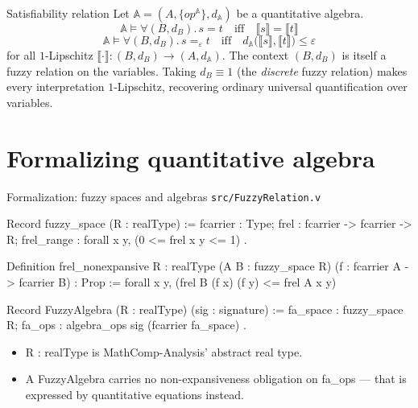 \documentclass[10pt,aspectratio=169]{beamer}
\newcommand{\qeq}[1]{=_{#1}}
\newcommand{\den}[1]{\llbracket #1 \rrbracket}
\newcommand{\eps}{\varepsilon}
\newcommand{\file}[1]{{\color{rocqcon}\texttt{#1}}}
\newcommand{\rid}[1]{{\ttfamily\small #1}}
\begin{document}
\begin{frame}{Satisfiability relation}
  Let $\mathbb{A} = (A, \{op^{\mathbb{A}}\}, d_{\mathbb{A}})$ be a
  quantitative algebra.
  \vfill
  \[
    \mathbb{A} \models \forall (B,d_B).\, s = t
    \quad\text{iff}\quad
    \den{s} = \den{t}
  \]
  \vspace{-1em}
  \[
    \mathbb{A} \models \forall (B,d_B).\, s \qeq{\eps} t
    \quad\text{iff}\quad
    d_{\mathbb{A}}\bigl(\den{s},\den{t}\bigr) \leq \eps
  \]
  \vfill
  for all $1$-Lipschitz $\den{\cdot} : (B,d_B) \to
  (A,d_\mathbb{A})$.
  \vfill
  \pause
  {\small The context $(B,d_B)$ is itself a fuzzy relation on the
  variables. Taking $d_B \equiv 1$ (the \emph{discrete} fuzzy relation)
  makes every interpretation $1$-Lipschitz, recovering ordinary
  universal quantification over variables.}
\end{frame}

\section{Formalizing quantitative algebra}

\begin{frame}[fragile]{Formalization: fuzzy spaces and algebras}
  \file{src/FuzzyRelation.v}
  \begin{srcbox}
Record fuzzy_space (R : realType) := {
    fcarrier : Type;
    frel : fcarrier -> fcarrier -> R;
    frel_range : forall x y, (0 <= frel x y <= 1)%
}.

Definition frel_nonexpansive {R : realType} (A B : fuzzy_space R)
    (f : fcarrier A -> fcarrier B) : Prop :=
  forall x y, (frel B (f x) (f y) <= frel A x y)%

Record FuzzyAlgebra (R : realType) (sig : signature) := {
  fa_space : fuzzy_space R;
  fa_ops : algebra_ops sig (fcarrier fa_space)
}.
  \end{srcbox}
  \begin{itemize}
    \item \rid{R : realType} is MathComp-Analysis' abstract real type.
    \item A \rid{FuzzyAlgebra} carries no non-expansiveness
      obligation on \rid{fa\_ops} --- that is expressed by
      quantitative equations instead.
  \end{itemize}
\end{frame}
\end{document}
